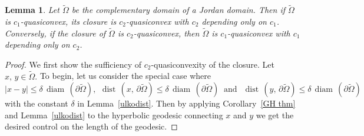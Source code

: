 \documentclass[reqno,11pt]{amsart}
\makeatletter
\def\dist{{\mathop\mathrm{\,dist\,}}}
\def\wz{\widetilde}
\def\ls{\lesssim}
\def\diam{{\mathop\mathrm{\,diam\,}}}
\newtheorem{lem}[thm]{Lemma}%
\numberwithin{equation}{section}
\theoremstyle{remark}
\makeatother
\begin{document}
\begin{lem}\label{qconvex}
Let $\wz \Omega$ be the complementary domain of a Jordan domain. Then if $\wz \Omega$ is $c_1$-quasiconvex, 
its closure is $c_2$-quasiconvex with $c_2$ depending only on $c_1$. Conversely, if the closure of $\wz \Omega$ is $c_2$-quasiconvex, then $\wz \Omega$ is $c_1$-quasiconvex with $c_1$ depending only on $c_2$.
\end{lem}
\begin{proof}
We first show the sufficiency of $c_2$-quasiconvexity of the closure. 
Let $x,\,y\in \wz \Omega.$
To begin, let us consider the special case where 
$$|x-y|\le \delta \diam( \partial {\wz \Omega}), \ \dist(x,\,\partial {\wz \Omega})\le \delta \diam( \partial {\wz \Omega}) \  \text{ and } \  \dist(y,\,\partial {\wz \Omega})\le \delta \diam( \partial {\wz \Omega})$$
  with the constant $\delta$ in Lemma~\ref{ulkodist}. Then by applying Corollary~\ref{GH thm} and Lemma~\ref{ulkodist} to the hyperbolic geodesic connecting $x$ and $y$ we get the desired control on the length of the geodesic. 



\end{proof}
\end{document}
